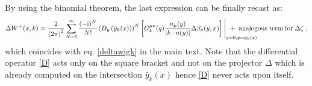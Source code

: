 \documentclass[prd,superscriptaddress,nofootinbib,notitlepage]{revtex4-1}
\newcommand{\ii}{{\rm i}}
\begin{document}
%
By using the binomial theorem, the last expression can be finally recast as:
%
\begin{equation*}
\Delta W^{+}(x,k)=\frac{2}{\left(2\pi\right)^2}\sum_{N=0}^{\infty} \frac{(-\ii)^{N}}{N!}
\left(D_y\left(\bar{y}_k(x)\right)\right)^{N}
\left[ G^{\mu\nu}_k(q)\frac{n_{\mu}(y)}{|k\cdot n(y)|} \Delta\beta_\nu(y,x) \right] 
\Bigg|_{q=0,y=\bar{y}_k(x)} \hspace{-1.5cm} +\; {\rm analogous \; term \; for \; \Delta\zeta}\;,
\end{equation*}
%
which coincides with eq. \eqref{deltawigk} in the main text. Note that the differential operator \eqref{D} acts only on the square bracket and not on the projector $\Delta$ which is already computed on the intersection $\bar{y}_k(x)$ hence \eqref{D} never acts upon itself.


\end{document}
